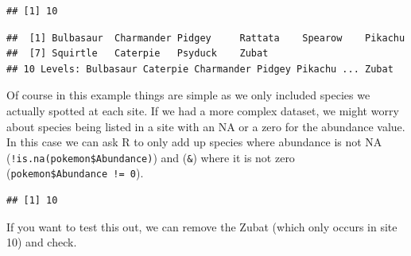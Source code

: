 \documentclass[]{book}
\newenvironment{Shaded}{\begin{snugshade}}{\end{snugshade}}
\newcommand{\KeywordTok}[1]{\textcolor[rgb]{0.13,0.29,0.53}{\textbf{{#1}}}}
\newcommand{\DecValTok}[1]{\textcolor[rgb]{0.00,0.00,0.81}{{#1}}}
\newcommand{\StringTok}[1]{\textcolor[rgb]{0.31,0.60,0.02}{{#1}}}
\newcommand{\CommentTok}[1]{\textcolor[rgb]{0.56,0.35,0.01}{\textit{{#1}}}}
\newcommand{\NormalTok}[1]{{#1}}
\theoremstyle{definition}
\theoremstyle{definition}
\theoremstyle{definition}
\theoremstyle{remark}
\begin{document}
\begin{verbatim}
## [1] 10
\end{verbatim}

\begin{Shaded}
\end{Shaded}

\begin{verbatim}
##  [1] Bulbasaur  Charmander Pidgey     Rattata    Spearow    Pikachu   
##  [7] Squirtle   Caterpie   Psyduck    Zubat     
## 10 Levels: Bulbasaur Caterpie Charmander Pidgey Pikachu ... Zubat
\end{verbatim}

Of course in this example things are simple as we only included species
we actually spotted at each site. If we had a more complex dataset, we
might worry about species being listed in a site with an NA or a zero
for the abundance value. In this case we can ask R to only add up
species where abundance is not NA (\texttt{!is.na(pokemon\$Abundance)})
and (\texttt{\&}) where it is not zero
(\texttt{pokemon\$Abundance\ !=\ 0}).

\begin{Shaded}
\end{Shaded}

\begin{verbatim}
## [1] 10
\end{verbatim}

If you want to test this out, we can remove the Zubat (which only occurs
in site 10) and check.

\begin{Shaded}
\end{Shaded}
\end{document}
